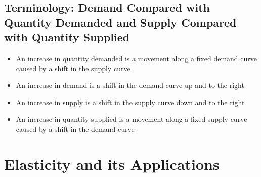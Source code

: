 \documentclass[12pt]{article}
\begin{document}
\subsection{Terminology: Demand Compared with Quantity Demanded and Supply Compared with Quantity Supplied}
\begin{itemize} 
\item An increase in quantity demanded is a movement along a fixed demand curve caused by a shift in the supply curve 
\item An increase in demand is a shift in the demand curve up and to the right
\item An increase in supply is a shift in the supply curve down and to the right 
\item An increase in quantity supplied is a movement along a fixed supply curve caused by a shift in the demand curve \end{itemize}

\section{Elasticity and its Applications}
\end{document}
